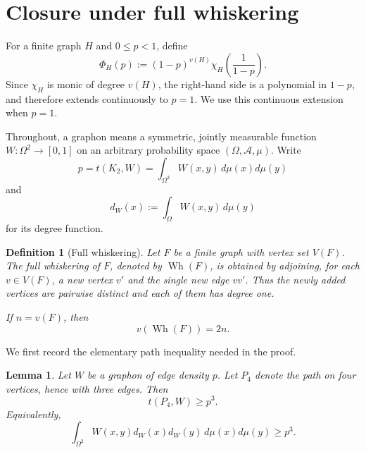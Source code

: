 \documentclass[11pt]{article}
\newtheorem{lemma}[theorem]{Lemma}
\newtheorem{definition}[theorem]{Definition}
\begin{document}
\section{Closure under full whiskering}

For a finite graph $H$ and $0\le p<1$, define
\[
    \Phi_H(p)
    :=
    (1-p)^{v(H)}
    \chi_H\!\left(\frac{1}{1-p}\right).
\]
Since $\chi_H$ is monic of degree $v(H)$, the right-hand side is
a polynomial in $1-p$, and therefore extends continuously to $p=1$.
We use this continuous extension when $p=1$.

Throughout, a graphon means a symmetric, jointly measurable function
$W:\Omega^2\to[0,1]$ on an arbitrary probability space
$(\Omega,\mathcal A,\mu)$.  Write
\[
    p=t(K_2,W)
      =
      \int_{\Omega^2}W(x,y)\,d\mu(x)d\mu(y)
\]
and
\[
    d_W(x):=\int_\Omega W(x,y)\,d\mu(y)
\]
for its degree function.

\begin{definition}[Full whiskering]
Let $F$ be a finite graph with vertex set $V(F)$.
The \emph{full whiskering} of $F$, denoted by $\operatorname{Wh}(F)$,
is obtained by adjoining, for each $v\in V(F)$, a new vertex $v'$
and the single new edge $vv'$.
Thus the newly added vertices are pairwise distinct and each of them
has degree one.

If $n=v(F)$, then
\[
    v(\operatorname{Wh}(F))=2n.
\]
\end{definition}

We first record the elementary path inequality needed in the proof.

\begin{lemma}\label{lem:P4}
Let $W$ be a graphon of edge density $p$. Let $P_4$ denote the path
on four vertices, hence with three edges. Then
\[
    t(P_4,W)\ge p^3.
\]
Equivalently,
\[
    \int_{\Omega^2}
        W(x,y)d_W(x)d_W(y)\,d\mu(x)d\mu(y)
    \ge p^3.
\]
\end{lemma}
\end{document}
